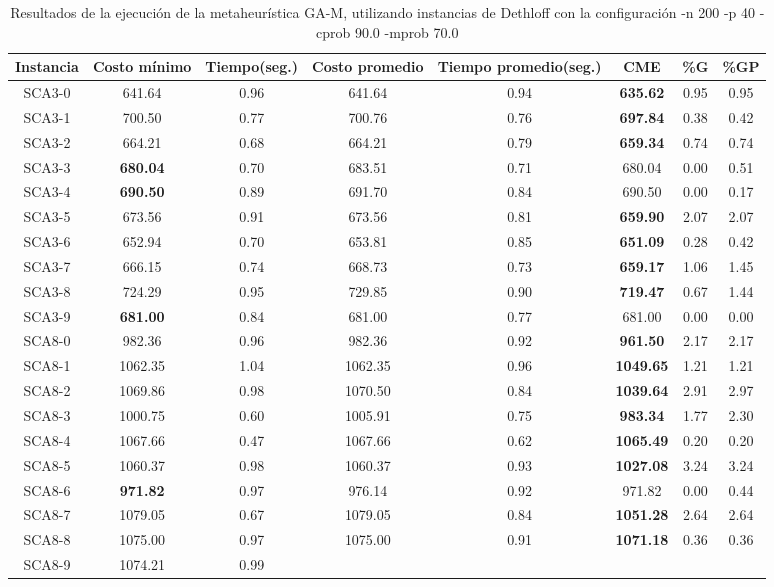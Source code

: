 \begin{table}[ht]
\caption{Resultados de la ejecución de la metaheurística GA-M, utilizando instancias de Dethloff con la configuración -n 200 -p 40 -cprob 90.0 -mprob 70.0}
\centering
\small
\begin{tabular}{c c c c c c c c}
\hline\hline
Instancia & Costo mínimo & Tiempo(seg.) & Costo promedio & Tiempo promedio(seg.) & CME & \%G & \%GP \\ [0.5ex]
\hline
SCA3-0 & 641.64 & 0.96 & 
641.64 & 0.94 & \bf{635.62} & 
0.95 & 0.95\\SCA3-1 & 700.50 & 0.77 & 
700.76 & 0.76 & \bf{697.84} & 
0.38 & 0.42\\SCA3-2 & 664.21 & 0.68 & 
664.21 & 0.79 & \bf{659.34} & 
0.74 & 0.74\\SCA3-3 & \bf{680.04} & 0.70 & 
683.51 & 0.71 & 680.04 & 0.00
 & 0.51\\SCA3-4 & \bf{690.50} & 0.89 & 
691.70 & 0.84 & 690.50 & 0.00
 & 0.17\\SCA3-5 & 673.56 & 0.91 & 
673.56 & 0.81 & \bf{659.90} & 
2.07 & 2.07\\SCA3-6 & 652.94 & 0.70 & 
653.81 & 0.85 & \bf{651.09} & 
0.28 & 0.42\\SCA3-7 & 666.15 & 0.74 & 
668.73 & 0.73 & \bf{659.17} & 
1.06 & 1.45\\SCA3-8 & 724.29 & 0.95 & 
729.85 & 0.90 & \bf{719.47} & 
0.67 & 1.44\\SCA3-9 & \bf{681.00} & 0.84 & 
681.00 & 0.77 & 681.00 & 0.00
 & 0.00\\
SCA8-0 & 982.36 & 0.96 & 
982.36 & 0.92 & \bf{961.50} & 
2.17 & 2.17\\SCA8-1 & 1062.35 & 1.04 & 
1062.35 & 0.96 & \bf{1049.65} & 
1.21 & 1.21\\SCA8-2 & 1069.86 & 0.98 & 
1070.50 & 0.84 & \bf{1039.64} & 
2.91 & 2.97\\SCA8-3 & 1000.75 & 0.60 & 
1005.91 & 0.75 & \bf{983.34} & 
1.77 & 2.30\\SCA8-4 & 1067.66 & 0.47 & 
1067.66 & 0.62 & \bf{1065.49} & 
0.20 & 0.20\\SCA8-5 & 1060.37 & 0.98 & 
1060.37 & 0.93 & \bf{1027.08} & 
3.24 & 3.24\\SCA8-6 & \bf{971.82} & 0.97 & 
976.14 & 0.92 & 971.82 & 0.00
 & 0.44\\SCA8-7 & 1079.05 & 0.67 & 
1079.05 & 0.84 & \bf{1051.28} & 
2.64 & 2.64\\SCA8-8 & 1075.00 & 0.97 & 
1075.00 & 0.91 & \bf{1071.18} & 
0.36 & 0.36\\SCA8-9 & 1074.21 & 0.99 & 

\end{tabular}
\end{table}
